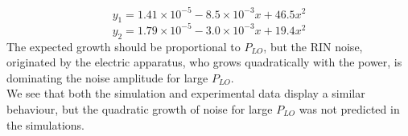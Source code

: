 %
\begin{equation}
y_1 = 1.41 \!\! \times \!\! 10^{-5} - 8.5 \!\! \times \!\! 10^{-3} x + 46.5 x^2
\end{equation}
\begin{equation}
y_2 = 1.79 \!\! \times \!\! 10^{-5} - 3.0 \!\! \times \!\! 10^{-3} x + 19.4 x^2
\end{equation}
%
The expected growth should be proportional to $P_{LO}$, but the RIN noise, originated by the electric apparatus, who grows quadratically with the power, is dominating the noise amplitude for large $P_{LO}$.\\
We see that both the simulation and experimental data display a similar behaviour, but the quadratic growth of noise for large $P_{LO}$ was not predicted in the simulations.\\
%
%




